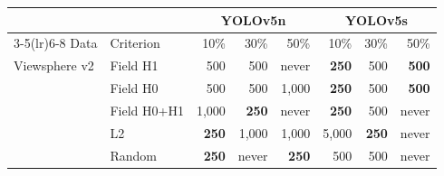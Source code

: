 \begin{tabular}{llrrrrrr}
\toprule
 & & \multicolumn{3}{c}{YOLOv5n} & \multicolumn{3}{c}{YOLOv5s} \\
\cmidrule(lr){3-5}\cmidrule(lr){6-8}
Data & Criterion & 10\% & 30\% & 50\% & 10\% & 30\% & 50\% \\
\midrule
Viewsphere v2 & Field H1 & 500 & 500 & never & \textbf{250} & 500 & \textbf{500} \\
 & Field H0 & 500 & 500 & 1,000 & \textbf{250} & 500 & \textbf{500} \\
 & Field H0+H1 & 1,000 & \textbf{250} & never & \textbf{250} & 500 & never \\
 & L2 & \textbf{250} & 1,000 & 1,000 & 5,000 & \textbf{250} & never \\
 & Random & \textbf{250} & never & \textbf{250} & 500 & 500 & never \\
\bottomrule
\end{tabular}
